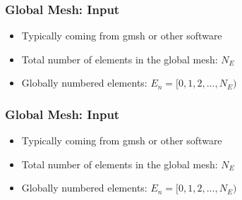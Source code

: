 \begin{frame}\frametitle{Global Mesh: Input}
\vspace{-20pt}
\begin{minipage}[t][0.3\textheight][t]{\textwidth}
\begin{itemize}
\item Typically coming from gmsh or other software
\item Total number of elements in the global mesh: $N_E$
\item Globally numbered elements: $E_n = [0, 1, 2,..., N_E)$
\end{itemize}
\end{minipage}
\vfill
{}
\end{frame}


\begin{frame}\frametitle{Global Mesh: Input}
\vspace{-20pt}
\begin{minipage}[t][0.3\textheight][t]{\textwidth}
\begin{itemize}
\item Typically coming from gmsh or other software
\item Total number of elements in the global mesh: $N_E$
\item Globally numbered elements: $E_n = [0, 1, 2,..., N_E)$
\end{itemize}
\end{minipage}
\vfill
{}
\end{frame}



